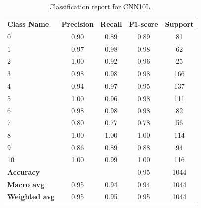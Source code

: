 \begin{table}[h]
    \centering
    \begin{tabular}{lcccc}
        \toprule
        \textbf{Class Name} & \textbf{Precision} & \textbf{Recall} & \textbf{F1-score} & \textbf{Support} \\
        \midrule
        0 & 0.90 & 0.89 & 0.89 & 81 \\
        1 & 0.97 & 0.98 & 0.98 & 62 \\
        2 & 1.00 & 0.92 & 0.96 & 25 \\
        3 & 0.98 & 0.98 & 0.98 & 166 \\
        4 & 0.94 & 0.97 & 0.95 & 137 \\
        5 & 1.00 & 0.96 & 0.98 & 111 \\
        6 & 0.98 & 0.98 & 0.98 & 82 \\
        7 & 0.80 & 0.77 & 0.78 & 56 \\
        8 & 1.00 & 1.00 & 1.00 & 114 \\
        9 & 0.86 & 0.89 & 0.88 & 94 \\
        10 & 1.00 & 0.99 & 1.00 & 116 \\
        \midrule
        \textbf{Accuracy} & & & 0.95 & 1044 \\
        \textbf{Macro avg} & 0.95 & 0.94 & 0.94 & 1044 \\
        \textbf{Weighted avg} & 0.95 & 0.95 & 0.95 & 1044 \\
        \bottomrule
    \end{tabular}
    \caption{Classification report for CNN10L.}
    \label{tab:classification_report_cnn10l}
\end{table}


